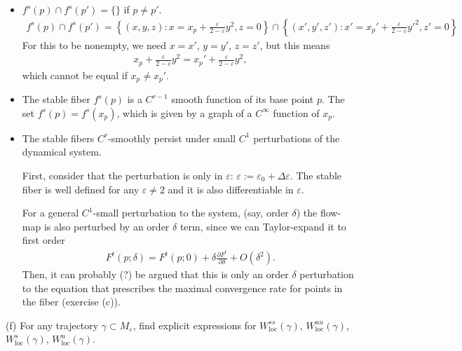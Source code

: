 \begin{solution}[9.5]
\begin{enumerate}
\begin{itemize}
\item $f^s(p)\cap f^s(p') = \{ \}$ if $p\neq p'$. 
\begin{align}
f^s(p)\cap f^s(p') = \left\{ (x,y,z): x = x_p+ \frac{\varepsilon}{2-\varepsilon}y^2, z=0 \right\} \cap \left\{ (x',y',z'): x' = x_p'+ \frac{\varepsilon}{2-\varepsilon}y'^2, z'=0 \right\}
\end{align}
For this to be nonempty, we need $x=x'$, $y=y'$, $z=z'$, but this means
\begin{align}
x_p + \frac{\varepsilon}{2-\varepsilon}y^2 = x_p'+ \frac{\varepsilon}{2-\varepsilon}y^2,
\end{align}
which cannot be equal if $x_p\neq x_p'$. 
\item The stable fiber $f^s(p)$ is a $C^{r-1}$ smooth function of its base point $p$. 
The set $f^s(p)=f^s(x_p)$, which is given by a graph of a $C^\infty$ function of $x_p$.
\item The stable fibers $C^r$-smoothly persist under small $C^1$ perturbations of the dynamical system.

First, consider that the perturbation is only in $\varepsilon$: $\varepsilon:= \varepsilon_0 + \Delta \varepsilon$. The stable fiber is well defined for any $\varepsilon \neq 2$ and it is also differentiable in $\varepsilon$. 


For a general $C^1$-small perturbation to the system, (say, order $\delta$) the flow-map is also perturbed by an order $\delta$ term, since we can Taylor-expand it to first order
\begin{align}
F^t(p;\delta) = F^t(p;0) + \delta \frac{\partial F^t}{\partial \delta} + O(\delta^2).
\end{align}
Then, it can probably (?) be argued that this is only an order $\delta$ perturbation to the equation that prescribes the maximal convergence rate for points in the fiber (exercise (c)).
\end{itemize}
(f) For any trajectory $\gamma \subset M_\varepsilon$, find explicit expressions for $W^{ss}_\text{loc}(\gamma)$, $W^{uu}_\text{loc}(\gamma)$, $W^{s}_\text{loc}(\gamma)$, $W^{u}_\text{loc}(\gamma)$.


\end{enumerate}
\end{solution}
